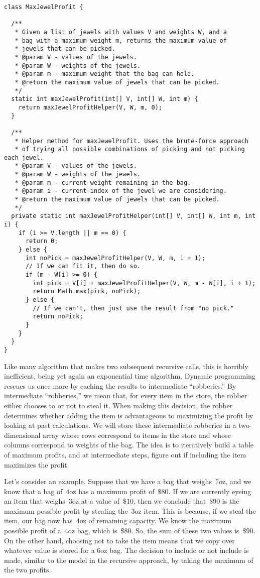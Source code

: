 \begin{lstlisting}[language=MyJava]
class MaxJewelProfit {

  /**
   * Given a list of jewels with values V and weights W, and a 
   * bag with a maximum weight m, returns the maximum value of 
   * jewels that can be picked.
   * @param V - values of the jewels.
   * @param W - weights of the jewels.
   * @param m - maximum weight that the bag can hold.
   * @return the maximum value of jewels that can be picked.
   */
  static int maxJewelProfit(int[] V, int[] W, int m) {
    return maxJewelProfitHelper(V, W, m, 0);
  }

  /**
   * Helper method for maxJewelProfit. Uses the brute-force approach 
   * of trying all possible combinations of picking and not picking each jewel.
   * @param V - values of the jewels.
   * @param W - weights of the jewels.
   * @param m - current weight remaining in the bag.
   * @param i - current index of the jewel we are considering.
   * @return the maximum value of jewels that can be picked.
   */
  private static int maxJewelProfitHelper(int[] V, int[] W, int m, int i) {
    if (i >= V.length || m == 0) {
      return 0;
    } else {
      int noPick = maxJewelProfitHelper(V, W, m, i + 1);
      // If we can fit it, then do so.
      if (m - W[i] >= 0) {
        int pick = V[i] + maxJewelProfitHelper(V, W, m - W[i], i + 1);
        return Math.max(pick, noPick);
      } else {
        // If we can't, then just use the result from "no pick."
        return noPick;
      }
    }
  }
}
\end{lstlisting}

Like many algorithm that makes two subsequent recursive calls, this is horribly inefficient, being yet again an exponential time algorithm. 
Dynamic programming rescues us once more by caching the results to intermediate ``robberies.''
By intermediate ``robberies,'' we mean that, for every item in the store, the robber either chooses to or not to steal it. 
When making this decision, the robber determines whether adding the item is advantageous to maximizing the profit by looking at past calculations.
We will store these intermediate robberies in a two-dimensional array whose rows correspond to items in the store and whose columns correspond to weights of the bag. 
The idea is to iteratively build a table of maximum profits, and at intermediate steps, figure out if including the item maximizes the profit.

Let's consider an example. Suppose that we have a bag that weighs~$7\text{oz}$, and we know that a bag of~$4\text{oz}$ has a maximum profit of~$\$80$. 
If we are currently eyeing an item that weighs~$3\text{oz}$ at a value of~$\$10$, then we conclude that~$\$90$ is the maximum possible profit by stealing the~$3\text{oz}$ item. 
This is because, if we steal the item, our bag now has~$4\text{oz}$ of remaining capacity. 
We know the maximum possible profit of a~$4\text{oz}$ bag, which is~$\$80$. 
So, the sum of these two values is~$\$90$. 
On the other hand, choosing not to take the item means that we copy over whatever value is stored for a $6\text{oz}$ bag. 
The decision to include or not include is made, similar to the model in the recursive approach, by taking the maximum of the two profits.

